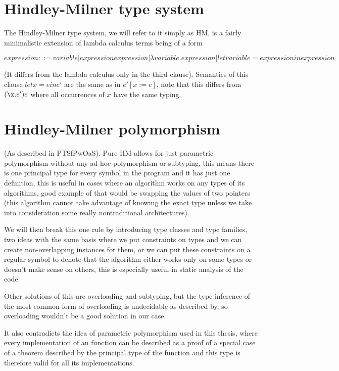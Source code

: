\section{Hindley-Milner type system}

The Hindley-Milner type system, we will refer to it simply as HM, is a fairly minimalistic extension of lambda calculus terms being of a form

$expression ::= variable | expression expression | \lambda variable . expression | let variable = expression in expression$

(It differs from the lambda calculus only in the third clause). Semantics of this clause $let x = e in e'$ are the same as in
$e'[x := e]$, note that this differs from $(\x . e') e$ where all occurrences of $x$ have the same typing. %


\section{Hindley-Milner polymorphism}

(As described in PTSfPwOaS).
Pure HM allows for just parametric polymorphism without any ad-hoc polymorphism
or subtyping, this means there is one principal type for every symbol in the program and it has just one definition, this is useful in cases
where an algorithm works on any types of its algorithms, good example of that would be swapping the values of two pointers (this algorithm cannot
take advantage of knowing the exact type unless we take into consideration some really nontraditional architectures).

We will then break this one
rule by introducing type classes and type families, two ideas with the same basis where we put constraints on types and we can
create non-overlapping instances for them, or we can put these constraints on a regular symbol to denote that the algorithm either works only on
some types or doesn't make sense on others, this is especially useful in static analysis of the code.

Other solutions of this are overloading and subtyping, but the type inference of the most common form of overloading is undecidable
as described by, so overloading wouldn't be a good solution in our case. %

It also contradicts the idea of parametric polymorphism used in this thesis, where every implementation of an function can be
described as a proof of a special case of a theorem described by the principal type of the function and this type is therefore
valid for all its implementations.

